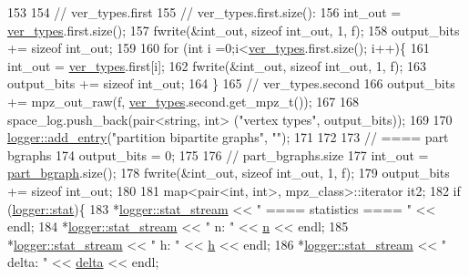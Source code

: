 \begin{DoxyCode}
153 
154   \textcolor{comment}{// ver\_types.first}
155   \textcolor{comment}{// ver\_types.first.size():}
156   int\_out = \hyperlink{classmarked__graph__compressed_af446cc5e23c241a92b76642fd5ebc403}{ver\_types}.first.size();
157   fwrite(&int\_out, \textcolor{keyword}{sizeof} int\_out, 1, f);
158   output\_bits += \textcolor{keyword}{sizeof} int\_out;
159 
160   \textcolor{keywordflow}{for} (\textcolor{keywordtype}{int} i =0;i<\hyperlink{classmarked__graph__compressed_af446cc5e23c241a92b76642fd5ebc403}{ver\_types}.first.size(); i++)\{
161     int\_out = \hyperlink{classmarked__graph__compressed_af446cc5e23c241a92b76642fd5ebc403}{ver\_types}.first[i];
162     fwrite(&int\_out, \textcolor{keyword}{sizeof} int\_out, 1, f);
163     output\_bits += \textcolor{keyword}{sizeof} int\_out;
164   \}
165   \textcolor{comment}{// ver\_types.second}
166   output\_bits += mpz\_out\_raw(f, \hyperlink{classmarked__graph__compressed_af446cc5e23c241a92b76642fd5ebc403}{ver\_types}.second.get\_mpz\_t());
167 
168   space\_log.push\_back(pair<string, int> (\textcolor{stringliteral}{"vertex types"}, output\_bits));
169 
170   \hyperlink{classlogger_a710163deb17bc81f70d53d285b8ac9ac}{logger::add\_entry}(\textcolor{stringliteral}{"partition bipartite graphs"}, \textcolor{stringliteral}{""});
171   
172 
173   \textcolor{comment}{// ==== part bgraphs}
174   output\_bits = 0;
175 
176   \textcolor{comment}{// part\_bgraphs.size}
177   int\_out = \hyperlink{classmarked__graph__compressed_a7b3267063fba30b45eb21b3ba4e07536}{part\_bgraph}.size();
178   fwrite(&int\_out, \textcolor{keyword}{sizeof} int\_out, 1, f);
179   output\_bits += \textcolor{keyword}{sizeof} int\_out;
180 
181   map<pair<int, int>, mpz\_class>::iterator it2;
182   \textcolor{keywordflow}{if} (\hyperlink{classlogger_a26812b5ba03f130e8dae3446d5fc032f}{logger::stat})\{
183     *\hyperlink{classlogger_a7db37821f875f2ba3540980b355779f5}{logger::stat\_stream} << \textcolor{stringliteral}{" ==== statistics ==== "} << endl;
184     *\hyperlink{classlogger_a7db37821f875f2ba3540980b355779f5}{logger::stat\_stream} << \textcolor{stringliteral}{" n:                "} << \hyperlink{classmarked__graph__compressed_a8d841016ddb11cfd33748c8deb6277ba}{n} << endl;
185     *\hyperlink{classlogger_a7db37821f875f2ba3540980b355779f5}{logger::stat\_stream} << \textcolor{stringliteral}{" h:                "} << \hyperlink{classmarked__graph__compressed_af6ff623407b673d08d0cab77b39c2193}{h} << endl;
186     *\hyperlink{classlogger_a7db37821f875f2ba3540980b355779f5}{logger::stat\_stream} << \textcolor{stringliteral}{" delta:            "} << \hyperlink{classmarked__graph__compressed_a8b2aaac68e9332ddc78d88eb60b323a7}{delta} << endl;

\end{DoxyCode}
